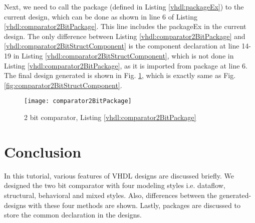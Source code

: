 

\begin{explanation}
	Next, we need to call the package (defined in Listing \ref{vhdl:packageEx}) to the current design, which can be done as shown in line 6 of Listing \ref{vhdl:comparator2BitPackage}. This line includes the packageEx in the current design. The only difference between Listing \ref{vhdl:comparator2BitPackage} and \ref{vhdl:comparator2BitStructComponent} is the component declaration at line 14-19 in Listing \ref{vhdl:comparator2BitStructComponent}, which is not done in Listing \ref{vhdl:comparator2BitPackage}, as it is imported from package at line 6. The final design generated is shown in Fig. \ref{fig:comparator2BitPackage}, which is exactly same as Fig. \ref{fig:comparator2BitStructComponent}. 
\end{explanation}

\begin{figure}
	\centering
	\texttt{[image: comparator2BitPackage]}
	\caption{2 bit comparator, Listing \ref{vhdl:comparator2BitPackage}}
	\label{fig:comparator2BitPackage}
\end{figure}


\section{Conclusion}
In this tutorial, various features of VHDL designs are discussed briefly. We designed the two bit comparator with four modeling styles i.e. dataflow, structural, behavioral and mixed styles. Also, differences between the generated-designs with these four methods are shown. Lastly, packages are discussed to store the common declaration in the designs. 